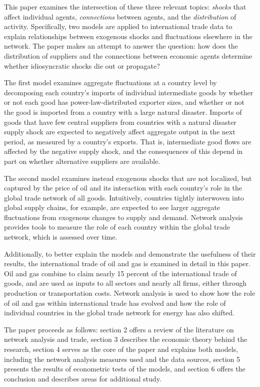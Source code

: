 \documentclass[10pt,letterpaper,pdftex]{article}
\begin{document}
This paper examines the intersection of these three relevant topics: \textsl{shocks} that affect individual agents, \textsl{connections} between agents, and the \textsl{distribution} of activity. Specifically, two models are applied to international trade data to explain relationships between exogenous shocks and fluctuations elsewhere in the network. The paper makes an attempt to answer the question: how does the distribution of suppliers and the connections between economic agents determine whether idiosyncratic shocks die out or propagate?

The first model examines aggregate fluctuations at a country level by decomposing each country's imports of individual intermediate goods by whether or not each good has power-law-distributed exporter sizes, and whether or not the good is imported from a country with a large natural disaster. Imports of goods that have few central suppliers from countries with a natural disaster supply shock are expected to negatively affect aggregate output in the next period, as measured by a country's exports. That is, intermediate good flows are affected by the negative supply shock, and the consequences of this depend in part on whether alternative suppliers are available. 

The second model examines instead exogenous shocks that are not localized, but captured by the price of oil and its interaction with each country's role in the global trade network of all goods. Intuitively, countries tightly interwoven into global supply chains, for example, are expected to see larger aggregate fluctuations from exogenous changes to supply and demand. Network analysis provides tools to measure the role of each country within the global trade network, which is assessed over time.

Additionally, to better explain the models and demonstrate the usefulness of their results, the international trade of oil and gas is examined in detail in this paper. Oil and gas combine to claim nearly 15 percent of the international trade of goods, and are used as inputs to all sectors and nearly all firms, either through production or transportation costs. Network analysis is used to show how the role of oil and gas within international trade has evolved and how the role of individual countries in the global trade network for energy has also shifted. 

The paper proceeds as follows: section 2 offers a review of the literature on network analysis and trade, section 3 describes the economic theory behind the research, section 4 serves as the core of the paper and explains both models, including the network analysis measures used and the data sources, section 5 presents the results of econometric tests of the models, and section 6 offers the conclusion and describes areas for additional study.
\end{document}
